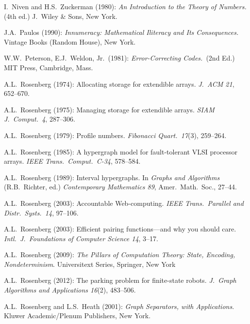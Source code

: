\begin{thebibliography}{999}
I.~Niven and H.S.~Zuckerman (1980):
{\it An Introduction to the Theory of Numbers.} (4th ed.)
J.~Wiley \& Sons, New York.




J.A.~Paulos (1990):
{\it Innumeracy: Mathematical Iliteracy and Its Consequences.}
Vintage Books (Random House), New York.

W.W.~Peterson, E.J.~Weldon, Jr.~(1981):
{\it Error-Correcting Codes.}~(2nd Ed.)
MIT Press, Cambridge, Mass.



A.L.~Rosenberg (1974): Allocating storage for extendible arrays.  {\it
J.~ACM 21}, 652--670.

A.L.~Rosenberg (1975): Managing storage for extendible arrays.  {\it
SIAM J.~Comput.~4}, 287--306.

A.L.~Rosenberg (1979): Profile numbers.  {\it Fibonacci Quart.~17}(3),
259--264.

A.L.~Rosenberg (1985): A hypergraph model for fault-tolerant VLSI
processor arrays.  {\it IEEE Trans.~Comput.~C-34}, 578--584.

A.L.~Rosenberg (1989): Interval hypergraphs.  In {\it Graphs and
  Algorithms} (R.B.~Richter, ed.) {\it Contemporary Mathematics 89},
Amer.~Math.~Soc., 27--44.

A.L.~Rosenberg (2003): Accountable Web-computing.  {\it IEEE
Trans.~Parallel and Distr.~Systs.~14}, 97--106.

A.L.~Rosenberg (2003): Efficient pairing functions---and why you
should care.  {\it Intl.~J.~Foundations of Computer Science 14},
3--17.

A.L.~Rosenberg (2009):
{\it The Pillars of Computation Theory: State, Encoding,
  Nondeterminism}.
Universitext Series, Springer, New York 

A.L.~Rosenberg (2012): The parking problem for finite-state
robots.  {\it J.~Graph Algorithms and Applications 16}(2),
483--506.

A.L.~Rosenberg and L.S.~Heath (2001):
{\it Graph Separators, with Applications}.
Kluwer Academic/Plenum Publishers, New York.


\end{thebibliography}
